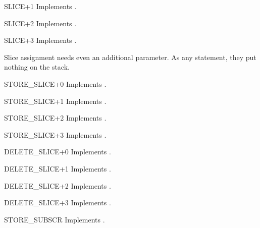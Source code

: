 \begin{opcodedesc}{SLICE+1}{}
Implements .
\end{opcodedesc}

\begin{opcodedesc}{SLICE+2}{}
Implements .
\end{opcodedesc}

\begin{opcodedesc}{SLICE+3}{}
Implements .
\end{opcodedesc}

Slice assignment needs even an additional parameter.  As any statement,
they put nothing on the stack.

\begin{opcodedesc}{STORE_SLICE+0}{}
Implements .
\end{opcodedesc}

\begin{opcodedesc}{STORE_SLICE+1}{}
Implements .
\end{opcodedesc}

\begin{opcodedesc}{STORE_SLICE+2}{}
Implements .
\end{opcodedesc}

\begin{opcodedesc}{STORE_SLICE+3}{}
Implements .
\end{opcodedesc}

\begin{opcodedesc}{DELETE_SLICE+0}{}
Implements .
\end{opcodedesc}

\begin{opcodedesc}{DELETE_SLICE+1}{}
Implements .
\end{opcodedesc}

\begin{opcodedesc}{DELETE_SLICE+2}{}
Implements .
\end{opcodedesc}

\begin{opcodedesc}{DELETE_SLICE+3}{}
Implements .
\end{opcodedesc}

\begin{opcodedesc}{STORE_SUBSCR}{}
Implements .
\end{opcodedesc}

